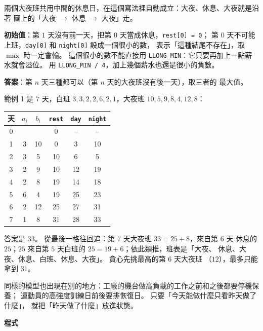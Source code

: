 兩個大夜班共用中間的休息日，在這個寫法裡自動成立：大夜、休息、大夜就是沿著
圖上的「大夜 $\to$ 休息 $\to$ 大夜」走。

\textbf{初始值}：第 $1$ 天沒有前一天，把第 $0$ 天當成休息，\texttt{rest[0] = 0}；
第 $0$ 天不可能上班，\texttt{day[0]} 和 \texttt{night[0]} 設成一個很小的數，
表示「這種結尾不存在」，取 $\max$ 時一定會輸。 這個很小的數不能直接用
\texttt{LLONG\_MIN}：它只要再加上一點薪水就會溢位。 用
\texttt{LLONG\_MIN / 4}，加上幾個薪水也還是很小的負數。

\textbf{答案}：第 $n$ 天三種都可以（第 $n$ 天的大夜班沒有後一天），取三者的
最大值。

範例 1 是 $7$ 天，白班 $3, 3, 2, 2, 6, 2, 1$，大夜班 $10, 5, 9, 8, 4, 12, 8$：

\begin{center}
\begin{tabular}{ccc|ccc}
\toprule
天 & $a_i$ & $b_i$ & \texttt{rest} & \texttt{day} & \texttt{night} \\
\midrule
0 & & & 0 & -- & -- \\
1 & 3 & 10 & 0 & 3 & 10 \\
2 & 3 & 5 & 10 & 6 & 5 \\
3 & 2 & 9 & 10 & 12 & 19 \\
4 & 2 & 8 & 19 & 14 & 18 \\
5 & 6 & 4 & 19 & 25 & 23 \\
6 & 2 & 12 & 25 & 27 & 31 \\
7 & 1 & 8 & 31 & 28 & 33 \\
\bottomrule
\end{tabular}
\end{center}

答案是 $33$。 從最後一格往回追：第 $7$ 天大夜班 $33 = 25 + 8$，來自第 $6$ 天
休息的 $25$；$25$ 來自第 $5$ 天白班的 $25 = 19 + 6$；依此類推，班表是「大夜、
休息、大夜、休息、白班、休息、大夜」。 貪心先挑最高的第 $6$ 天大夜班
（$12$），最多只能拿到 $31$。

同樣的模型也出現在別的地方：工廠的機台做高負載的工作之前和之後都要停機保養；
運動員的高強度訓練日前後要排恢復日。 只要「今天能做什麼只看昨天做了什麼」，
就把「昨天做了什麼」放進狀態。

\textbf{程式}

